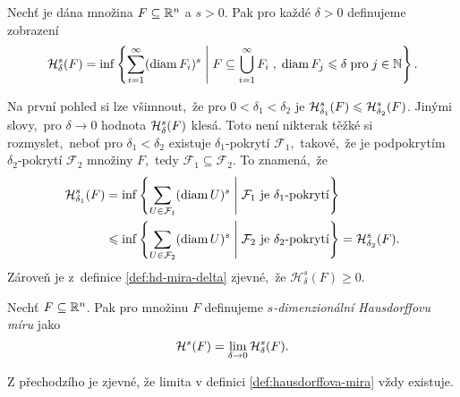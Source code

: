 \begin{definition}\label{def:hd-mira-delta}
    Nechť je dána množina $F\subseteq\R^n$ a $s>0$. Pak pro každé $\delta>0$ definujeme zobrazení
    \[\hausdorffdeltameasure{s}{\delta}(F)=\inf\set{\sum_{i=1}^{\infty}(\diam{F_i})^s\;\middle|\;F\subseteq\bigcup_{i=1}^\infty F_i\;,\;\diam{F_j}\leqslant\delta\;\text{pro}\;j\in\N}.\]
\end{definition}
Na první pohled si lze všimnout,~že pro $0<\delta_1<\delta_2$ je $\hausdorffdeltameasure{s}{\delta_1}(F)\leqslant\hausdorffdeltameasure{s}{\delta_2}(F)$. Jinými slovy,~pro $\delta\to 0$ hodnota $\hausdorffdeltameasure{s}{\delta}(F)$ klesá. Toto není nikterak těžké si rozmyslet,~neboť pro $\delta_1<\delta_2$ existuje $\delta_1$-pokrytí $\mathcal{F}_1$,~takové,~že je podpokrytím $\delta_2$-pokrytí $\mathcal{F}_2$ množiny $F$,~tedy $\mathcal{F}_1\subseteq\mathcal{F}_2$. To znamená,~že
\begin{align*}
    \hausdorffdeltameasure{s}{\delta_1}(F)&=\inf\set{\sum_{U\in\mathcal{F}_1}(\diam{U})^s\;\middle|\;\text{$\mathcal{F}_1$ je $\delta_1$-pokrytí}}\\
    &\leqslant\inf\set{\sum_{U\in\mathcal{F}_2}(\diam{U})^s\;\middle|\;\text{$\mathcal{F}_2$ je $\delta_2$-pokrytí}}=\hausdorffdeltameasure{s}{\delta_2}(F).
\end{align*}
Zároveň je z~definice \ref{def:hd-mira-delta} zjevné,~že $\mathcal{H}_\delta^s(F)\geqslant 0$.
\begin{definition}\label{def:hausdorffova-mira}
    Nechť $F\subseteq\R^n$. Pak pro množinu $F$ definujeme \emph{$s$-dimenzionální Hausdorffovu míru} jako
    \[\hausdorffmeasure{s}(F)=\lim_{\delta\to 0}\hausdorffdeltameasure{s}{\delta}(F).\]
\end{definition}
Z přechodzího je zjevné, že limita v definici \ref{def:hausdorffova-mira} vždy existuje.

